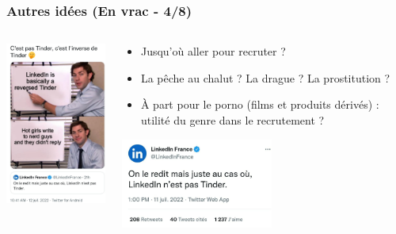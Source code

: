 \documentclass[slidetop,11pt]{beamer}
\begin{document}
\begin{frame}
	\frametitle{Autres id{\'e}es (En vrac - 4/8)}
	\begin{columns}[T]
	\begin{column}[T]{5cm}
		\includegraphics[width=5cm]{img/1657616562690.jpeg}~\\
	\end{column}
	\begin{column}[T]{7cm}
		\begin{itemize}
			\item Jusqu'o{\`u} aller pour recruter ? 
			\item La p{\^e}che au chalut ? La drague ? La prostitution ?
			\item {\`A} part pour le porno (films et produits d{\'e}riv{\'e}s) : utilit{\'e} du genre dans le recrutement ?
		\end{itemize}%
		\includegraphics[width=5cm]{img/1657616562426.jpeg}~\\
	\end{column}
	\end{columns}
\end{frame}
\end{document}
